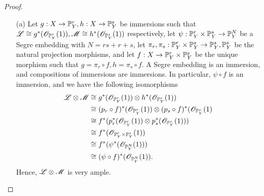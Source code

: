 \documentclass{article}
\begin{document}
\begin{enumerate} [label=\textbf{\arabic*.}, leftmargin=0em]
\begin{proof} $ $ \vspace{0pt}
    \begin{itemize} [leftmargin=0cm]
        \item[(a)] Let $g : X \to \mathbb{P}_Y^r, h : X \to \mathbb{P}_Y^s$ be immersions such that $\mathscr{L} \cong g^* (\mathscr{O}_{\mathbb{P}_Y^r}(1)), \mathscr{M} \cong h^*(\mathscr{O}_{\mathbb{P}_Y^s}(1))$ respectively, let $\psi : \mathbb{P}_Y^r \times \mathbb{P}_Y^s \to \mathbb{P}_Y^N$ be a Segre embedding with $N = rs + r + s$, let $\pi_r, \pi_s : \mathbb{P}_Y^r \times \mathbb{P}_Y^s \to \mathbb{P}_Y^s, \mathbb{P}_Y^s$ be the natural projection morphisms, and let $f : X \to \mathbb{P}_Y^r \times \mathbb{P}_Y^s$ be the unique morphism such that $g = \pi_r \circ f, h = \pi_s \circ f$. A Segre embedding is an immersion, and compositions of immersions are immersions. In particular, $\psi \circ f$ is an immersion, and we have the following isomorphisms
        \begin{align*}
            \mathscr{L} \otimes \mathscr{M} & \cong g^*(\mathscr{O}_{\mathbb{P}_Y^r}(1)) \otimes h^*(\mathscr{O}_{\mathbb{P}_Y^s}(1)) \\
            & \cong (p_r \circ f)^*(\mathscr{O}_{\mathbb{P}_Y^r}(1)) \otimes (p_s \circ f)^*(\mathscr{O}_{\mathbb{P}_Y^s}(1) \\
            & \cong f^*(p_r^*(\mathscr{O}_{\mathbb{P}_Y^r}(1)) \otimes p_s^*(\mathscr{O}_{\mathbb{P}_Y^s}(1))) \\
            & \cong f^* (\mathscr{O}_{\mathbb{P}_Y^r \times \mathbb{P}_Y^s}(1)) \\
            & \cong f^*(\psi^* (\mathscr{O}_{\mathbb{P}_Y^N}(1))) \\
            & \cong (\psi \circ f)^*(\mathscr{O}_{\mathbb{P}_Y^N}(1)).
        \end{align*}
        Hence, $\mathscr{L} \otimes \mathscr{M}$ is very ample.


\end{itemize}
\end{proof}
\end{enumerate}
\end{document}
